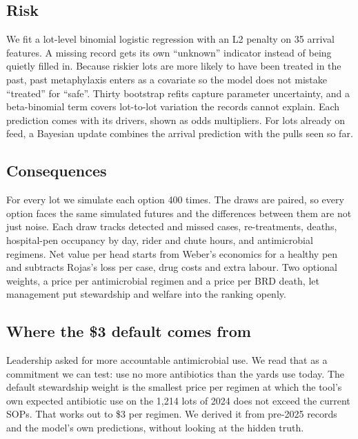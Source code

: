 \documentclass[10pt,letterpaper]{article}
\newcommand{\usd}[1]{\$#1}
\begin{document}
\subsection{Risk}
We fit a lot-level binomial logistic regression with an L2 penalty on 35 arrival features. A missing record gets its own ``unknown'' indicator instead of being quietly filled in. Because riskier lots are more likely to have been treated in the past, past metaphylaxis enters as a covariate so the model does not mistake ``treated'' for ``safe''. Thirty bootstrap refits capture parameter uncertainty, and a beta-binomial term covers lot-to-lot variation the records cannot explain. Each prediction comes with its drivers, shown as odds multipliers. For lots already on feed, a Bayesian update combines the arrival prediction with the pulls seen so far.

\subsection{Consequences}
For every lot we simulate each option 400 times. The draws are paired, so every option faces the same simulated futures and the differences between them are not just noise. Each draw tracks detected and missed cases, re-treatments, deaths, hospital-pen occupancy by day, rider and chute hours, and antimicrobial regimens. Net value per head starts from Weber's economics for a healthy pen and subtracts Rojas's loss per case, drug costs and extra labour. Two optional weights, a price per antimicrobial regimen and a price per BRD death, let management put stewardship and welfare into the ranking openly.

\subsection{Where the \$3 default comes from}
Leadership asked for more accountable antimicrobial use. We read that as a commitment we can test: use no more antibiotics than the yards use today. The default stewardship weight is the smallest price per regimen at which the tool's own expected antibiotic use on the 1,214 lots of 2024 does not exceed the current SOPs. That works out to \usd{3} per regimen. We derived it from pre-2025 records and the model's own predictions, without looking at the hidden truth.
\end{document}
